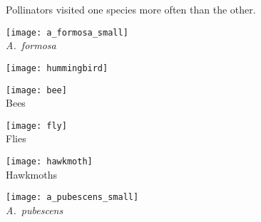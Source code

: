 \documentclass[t,handout]{beamer}  %
\begin{document}
\begin{frame}[t]{Pollinators visited one species more often than the other.}

	\vspace*{-1\baselineskip}
	
	\begin{multicols}{3}
		
		\vspace*{3\baselineskip}
		
		\texttt{[image: a\_formosa\_small]}\\
		\textit{A.~formosa}
				
	\columnbreak
	
		\begin{center}
			
		\texttt{[image: hummingbird]}\\
		\vspace*{-0.5ex}{\footnotesize Hummingbirds}
		
		\bigskip

		\texttt{[image: bee]}\\
		{\footnotesize Bees}
		
		\bigskip
		
		\texttt{[image: fly]}\\
		{\footnotesize Flies}
		
		\bigskip
	
		\texttt{[image: hawkmoth]}\\
		{\footnotesize Hawkmoths}
		
		\end{center}
	\columnbreak
	
		\vspace*{3\baselineskip}

		\hfill \texttt{[image: a\_pubescens\_small]}\\
		\hfill \textit{A.~pubescens}
		
\end{multicols}
\end{frame}
\end{document}

